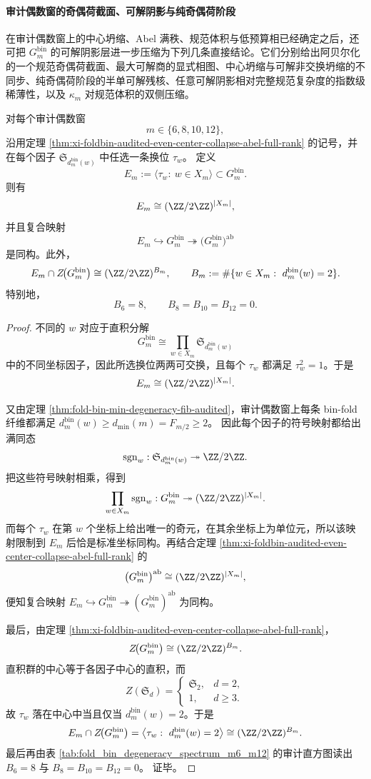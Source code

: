 \paragraph{审计偶数窗的奇偶荷截面、可解阴影与纯奇偶荷阶段}
在审计偶数窗上的中心坍缩、Abel 满秩、规范体积与低预算相已经确定之后，还可把
\(
G_m^{\mathrm{bin}}
\)
的可解阴影层进一步压缩为下列几条直接结论。它们分别给出阿贝尔化的一个规范奇偶荷截面、最大可解商的显式相图、中心坍缩与可解非交换坍缩的不同步、纯奇偶荷阶段的半单可解残核、任意可解阴影相对完整规范复杂度的指数级稀薄性，以及
\(
\kappa_m
\)
对规范体积的双侧压缩。

\begin{theorem}[奇偶荷截面的中心交公式]\label{thm:xi-foldbin-even-window-parity-section-center-intersection}
对每个审计偶数窗
\[
m\in\{6,8,10,12\},
\]
沿用定理 \ref{thm:xi-foldbin-audited-even-center-collapse-abel-full-rank} 的记号，并在每个因子
\(
\mathfrak S_{d_m^{\mathrm{bin}}(w)}
\)
中任选一条换位
\(
\tau_w
\)。
定义
\[
E_m:=\bigl\langle \tau_w:\ w\in X_m\bigr\rangle\subset G_m^{\mathrm{bin}}.
\]
则有
\[
E_m\cong (\ZZ/2\ZZ)^{|X_m|},
\]
并且复合映射
\[
E_m\hookrightarrow G_m^{\mathrm{bin}}\twoheadrightarrow
\bigl(G_m^{\mathrm{bin}}\bigr)^{\mathrm{ab}}
\]
是同构。此外，
\[
E_m\cap Z\!\bigl(G_m^{\mathrm{bin}}\bigr)\cong (\ZZ/2\ZZ)^{B_m},
\qquad
B_m:=\#\{w\in X_m:\ d_m^{\mathrm{bin}}(w)=2\}.
\]
特别地，
\[
B_6=8,
\qquad
B_8=B_{10}=B_{12}=0.
\]
\end{theorem}
\begin{proof}
不同的 \(w\) 对应于直积分解
\[
G_m^{\mathrm{bin}}
\cong
\prod_{w\in X_m}\mathfrak S_{d_m^{\mathrm{bin}}(w)}
\]
中的不同坐标因子，因此所选换位两两可交换，且每个 \(\tau_w\) 都满足 \(\tau_w^2=1\)。于是
\[
E_m\cong (\ZZ/2\ZZ)^{|X_m|}.
\]

又由定理 \ref{thm:fold-bin-min-degeneracy-fib-audited}，审计偶数窗上每条 bin-fold 纤维都满足
\(
d_m^{\mathrm{bin}}(w)\ge d_{\min}(m)=F_{m/2}\ge 2
\)。
因此每个因子的符号映射都给出满同态
\[
\operatorname{sgn}_w:\mathfrak S_{d_m^{\mathrm{bin}}(w)}\twoheadrightarrow \ZZ/2\ZZ.
\]
把这些符号映射相乘，得到
\[
\prod_{w\in X_m}\operatorname{sgn}_w:
G_m^{\mathrm{bin}}
\twoheadrightarrow
(\ZZ/2\ZZ)^{|X_m|}.
\]
而每个 \(\tau_w\) 在第 \(w\) 个坐标上给出唯一的奇元，在其余坐标上为单位元，所以该映射限制到 \(E_m\) 后恰是标准坐标同构。再结合定理 \ref{thm:xi-foldbin-audited-even-center-collapse-abel-full-rank} 的
\[
\bigl(G_m^{\mathrm{bin}}\bigr)^{\mathrm{ab}}
\cong
(\ZZ/2\ZZ)^{|X_m|},
\]
便知复合映射
\(
E_m\hookrightarrow G_m^{\mathrm{bin}}\twoheadrightarrow (G_m^{\mathrm{bin}})^{\mathrm{ab}}
\)
为同构。

最后，由定理 \ref{thm:xi-foldbin-audited-even-center-collapse-abel-full-rank}，
\[
Z\!\bigl(G_m^{\mathrm{bin}}\bigr)\cong (\ZZ/2\ZZ)^{B_m}.
\]
直积群的中心等于各因子中心的直积，而
\[
Z(\mathfrak S_d)=
\begin{cases}
\mathfrak S_2,& d=2,\\
1,& d\ge 3.
\end{cases}
\]
故 \(\tau_w\) 落在中心中当且仅当 \(d_m^{\mathrm{bin}}(w)=2\)。于是
\[
E_m\cap Z\!\bigl(G_m^{\mathrm{bin}}\bigr)
=
\bigl\langle \tau_w:\ d_m^{\mathrm{bin}}(w)=2\bigr\rangle
\cong
(\ZZ/2\ZZ)^{B_m}.
\]
最后再由表 \ref{tab:fold_bin_degeneracy_spectrum_m6_m12} 的审计直方图读出
\(
B_6=8
\)
与
\(
B_8=B_{10}=B_{12}=0
\)。
证毕。
\end{proof}
